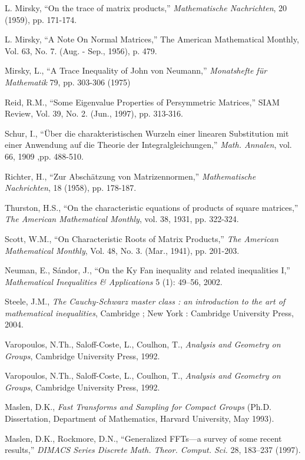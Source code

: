 \documentclass{svmult}
\begin{document}
\begin{thebibliography}{99}
L. Mirsky, ``On the trace of matrix products,'' {\it Mathematische Nachrichten}, 20 (1959), pp. 171-174.

L. Mirsky, ``A Note On Normal Matrices,''
The American Mathematical Monthly, Vol. 63, No. 7. (Aug. - Sep., 1956), p. 479.

Mirsky, L., ``A Trace Inequality of John von Neumann,''
{\it Monatshefte f\"{u}r Mathematik} 79, pp. 303-306 (1975)

Reid, R.M., ``Some Eigenvalue Properties of Persymmetric Matrices,''
SIAM Review, Vol. 39, No. 2. (Jun., 1997), pp. 313-316.

Schur, I., ``\"{U}ber die charakteristischen Wurzeln einer linearen Substitution mit einer Anwendung
auf die Theorie der Integralgleichungen,'' {\it Math. Annalen}, vol. 66, 1909 ,pp. 488-510.

Richter, H., ``Zur Absch\"{a}tzung von Matrizennormen,''
 {\it Mathematische Nachrichten}, 18 (1958), pp. 178-187.

Thurston, H.S., ``On the characteristic equations of products of square matrices,''
{\it The American Mathematical Monthly}, vol. 38, 1931, pp. 322-324.

Scott, W.M., ``On Characteristic Roots of Matrix Products,'' {\it
The American Mathematical Monthly}, Vol. 48, No. 3. (Mar., 1941), pp. 201-203.

Neuman, E., S\'{a}ndor, J., 
``On the Ky Fan inequality and related inequalities I,''
{\it Mathematical Inequalities \& Applications} 5 (1): 49–56, 2002.

Steele, J.M., {\it 
The Cauchy-Schwarz master class : an introduction to the art of mathematical inequalities},
Cambridge ; New York : Cambridge University Press, 2004.

Varopoulos, N.Th., Saloff-Coste, L., Coulhon, T.,
{\it Analysis and Geometry on Groups}, Cambridge University Press,
1992.


Varopoulos, N.Th., Saloff-Coste, L., Coulhon, T.,
{\it Analysis and Geometry on Groups}, Cambridge University Press,
1992.

Maslen, D.K., {\it Fast Transforms and Sampling for Compact
Groups} (Ph.D. Dissertation, Department of Mathematics,
Harvard University, May 1993).

Maslen, D.K., Rockmore, D.N., ``Generalized FFTs—a
survey of some recent results,'' {\it DIMACS Series Discrete Math.
Theor. Comput. Sci.} 28, 183–237 (1997).


\end{thebibliography}
\end{document}
